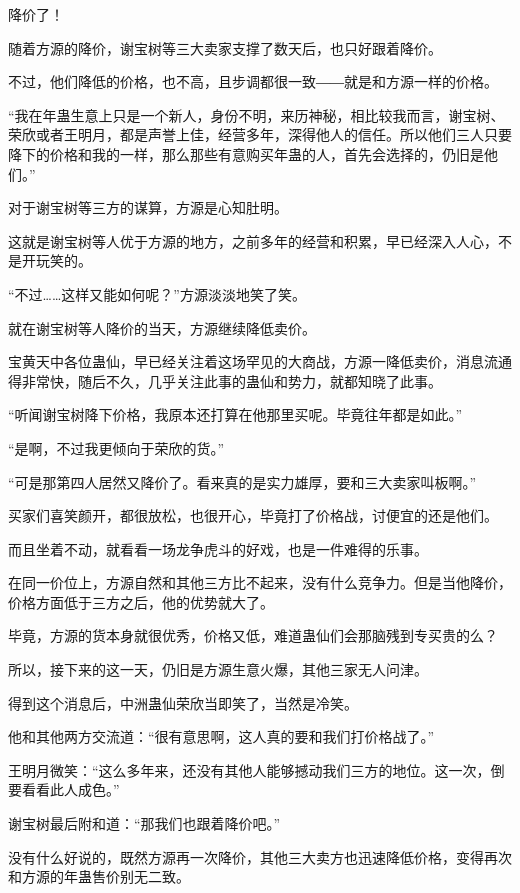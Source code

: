 
\begin{this_body}

降价了！

随着方源的降价，谢宝树等三大卖家支撑了数天后，也只好跟着降价。

不过，他们降低的价格，也不高，且步调都很一致――就是和方源一样的价格。

“我在年蛊生意上只是一个新人，身份不明，来历神秘，相比较我而言，谢宝树、荣欣或者王明月，都是声誉上佳，经营多年，深得他人的信任。所以他们三人只要降下的价格和我的一样，那么那些有意购买年蛊的人，首先会选择的，仍旧是他们。”

对于谢宝树等三方的谋算，方源是心知肚明。

这就是谢宝树等人优于方源的地方，之前多年的经营和积累，早已经深入人心，不是开玩笑的。

“不过……这样又能如何呢？”方源淡淡地笑了笑。

就在谢宝树等人降价的当天，方源继续降低卖价。

宝黄天中各位蛊仙，早已经关注着这场罕见的大商战，方源一降低卖价，消息流通得非常快，随后不久，几乎关注此事的蛊仙和势力，就都知晓了此事。

“听闻谢宝树降下价格，我原本还打算在他那里买呢。毕竟往年都是如此。”

“是啊，不过我更倾向于荣欣的货。”

“可是那第四人居然又降价了。看来真的是实力雄厚，要和三大卖家叫板啊。”

买家们喜笑颜开，都很放松，也很开心，毕竟打了价格战，讨便宜的还是他们。

而且坐着不动，就看看一场龙争虎斗的好戏，也是一件难得的乐事。

在同一价位上，方源自然和其他三方比不起来，没有什么竞争力。但是当他降价，价格方面低于三方之后，他的优势就大了。

毕竟，方源的货本身就很优秀，价格又低，难道蛊仙们会那脑残到专买贵的么？

所以，接下来的这一天，仍旧是方源生意火爆，其他三家无人问津。

得到这个消息后，中洲蛊仙荣欣当即笑了，当然是冷笑。

他和其他两方交流道：“很有意思啊，这人真的要和我们打价格战了。”

王明月微笑：“这么多年来，还没有其他人能够撼动我们三方的地位。这一次，倒要看看此人成色。”

谢宝树最后附和道：“那我们也跟着降价吧。”

没有什么好说的，既然方源再一次降价，其他三大卖方也迅速降低价格，变得再次和方源的年蛊售价别无二致。


\end{this_body}
